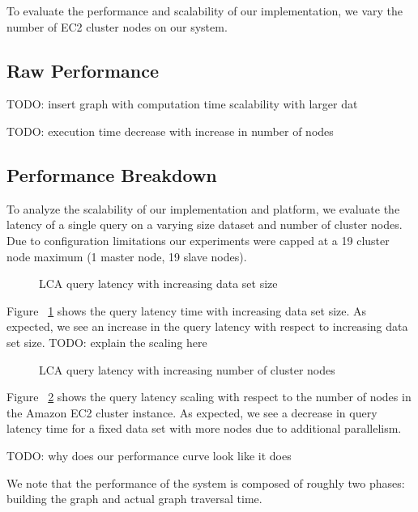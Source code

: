 \documentclass{article}
\begin{document}
To evaluate the performance and scalability of our implementation, we vary the number of EC2 cluster nodes on our system. 

\subsection{Raw Performance}



TODO: insert graph with computation time scalability with larger dat

TODO: execution time decrease with increase in number of nodes

\subsection{Performance Breakdown}

To analyze the scalability of our implementation and platform, we evaluate the latency of a single query on a varying size dataset and number of cluster nodes.
Due to configuration limitations our experiments were capped at a 19 cluster node maximum (1 master node, 19 slave nodes).

\begin{figure}
\centering
\caption{LCA query latency with increasing data set size}
\label{latency_scaling}
\end{figure}

Figure ~\ref{latency_scaling} shows the query latency time with increasing data set size.
As expected, we see an increase in the query latency with respect to increasing data set size. 
TODO: explain the scaling here

\begin{figure}
\centering
\caption{LCA query latency with increasing number of cluster nodes}
\label{node_scaling}
\end{figure}

Figure ~\ref{node_scaling} shows the query latency scaling with respect to the number of nodes in the Amazon EC2 cluster instance.
As expected, we see a decrease in query latency time for a fixed data set with more nodes due to additional parallelism.


TODO: why does our performance curve look like it does

We note that the performance of the system is composed of roughly two phases: building the graph and actual graph traversal time.
\end{document}

